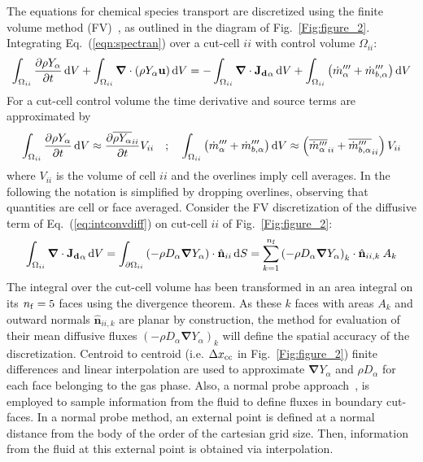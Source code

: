 \documentclass[journal,article,atmosphere,submit,moreauthors,pdftex]{Definitions_Review_Process/mdpi}
\newcommand{\dV}{{\rm d}V}
\newcommand{\dS}{{\rm d}S}
\begin{document}
The equations for chemical species transport are discretized using the finite volume method (FV)~\cite{eymard_2000,leveque_2002}, as outlined in the diagram of Fig.~\ref{Fig:figure_2}. Integrating Eq.~(\ref{eqn:spectran}) over a cut-cell $ii$ with control volume $\Omega_{ii}$:
\begin{equation}
 \int_{\Omega_{ii}} {\frac{\partial \rho Y_\alpha}{\partial t}} \, \dV + \int_{\Omega_{ii}} { \boldsymbol{\nabla} \cdot  \left(  \rho Y_\alpha \mathbf{u} \right)
      } \, \dV  = -\int_{\Omega_{ii}} { \boldsymbol{\nabla} \cdot \mathbf{J_{d}}_\alpha   } \, \dV + \int_{\Omega_{ii}} { \left( \dot{m}_\alpha'''+\dot{m}_{b,\alpha}''' \right) } \, \dV \label{eq:intconvdiff}
\end{equation}
For a cut-cell control volume the time derivative and source terms are approximated by
\begin{equation}
  \int_{\Omega_{ii}} {\frac{\partial \rho Y_\alpha}{\partial t}} \, \dV \approx \frac{\partial \overline{\rho Y_\alpha }_{ii}}{\partial t} V_{ii} \quad ; \quad
  \int_{\Omega_{ii}} { \left( \dot{m}_\alpha''' +\dot{m}_{b,\alpha}''' \right)} \, \dV \approx \left(\overline{ \dot{m}_\alpha''' }_{ii}+ \overline{\dot{m}_{b,\alpha}'''}_{ii} \right) V_{ii} \label{eq:intcons}
\end{equation}
where $V_{ii}$ is the volume of cell $ii$ and the overlines imply cell averages. In the following the notation is simplified by dropping overlines, observing that quantities are cell or face averaged. Consider the FV discretization of the diffusive term of Eq.~(\ref{eq:intconvdiff}) on cut-cell $ii$ of Fig.~\ref{Fig:figure_2}:
\begin{equation}
\int_{\Omega_{ii}} { \boldsymbol{\nabla} \cdot   \mathbf{J_{d}}_\alpha   } \, \dV =
    \int_{\partial \Omega_{ii}} { \left( - \rho D_\alpha \boldsymbol{\nabla} Y_\alpha \right) \cdot \hat{\mathbf{n}}_{ii} } \, \dS = \sum^{n_{\rm f}}_{k=1}
    \left( - \rho D_\alpha \boldsymbol{\nabla} Y_\alpha \right)_k \cdot \hat{\mathbf{n}}_{ii,k} \: A_k \label{eq:discfvdiffcc}
\end{equation}
The integral over the cut-cell volume has been transformed in an area integral on its $n_{\rm f}=5$ faces using the divergence theorem. As these $k$ faces with areas $A_k$ and outward normals $\hat{\mathbf{n}}_{ii,k}$ are planar by construction, the method for evaluation of their mean diffusive fluxes $\left( - \rho D_\alpha \boldsymbol{\nabla} Y_\alpha \right)_k$ will define the spatial accuracy of the discretization. Centroid to centroid (i.e. $\Delta x_{\rm cc}$ in Fig.~\ref{Fig:figure_2}) finite differences and linear interpolation are used to approximate $\boldsymbol{\nabla} Y_\alpha$ and $\rho D_\alpha$ for each face belonging to the gas phase. Also, a normal probe approach~\cite{balaras_2004}, is employed to sample information from the fluid to define fluxes in boundary cut-faces. In a normal probe method, an external point is defined at a normal distance from the body of the order of the cartesian grid size. Then, information from the fluid at this external point is obtained via interpolation. 
\end{document}
